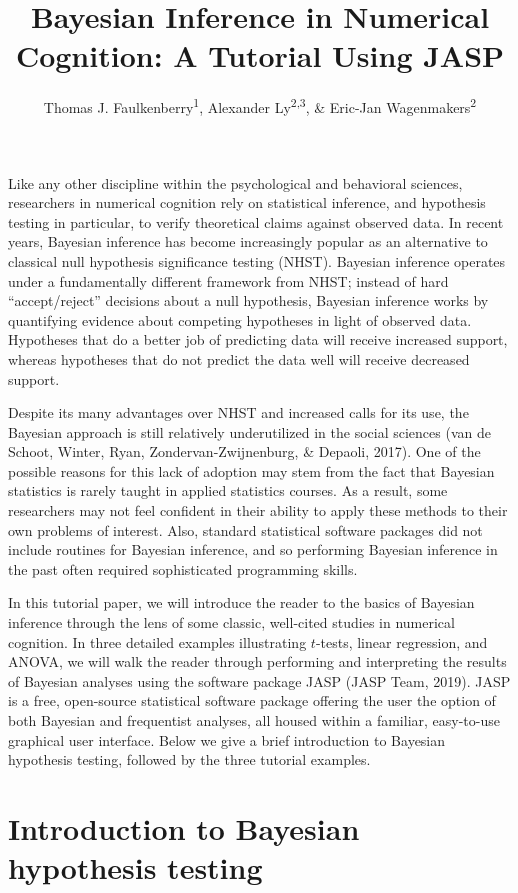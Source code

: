 \documentclass[english,,doc,floatsintext]{apa6}
\title{Bayesian Inference in Numerical Cognition: A Tutorial Using JASP}
\author{Thomas J. Faulkenberry\textsuperscript{1}, Alexander Ly\textsuperscript{2,3}, \& Eric-Jan Wagenmakers\textsuperscript{2}}
\date{}
\affiliation{
\vspace{0.5cm}
\textsuperscript{1} Tarleton State University\\\textsuperscript{2} University of Amsterdam\\\textsuperscript{3} Centrum Wiskunde \& Informatica}
\begin{document}
\maketitle

Like any other discipline within the psychological and behavioral sciences, researchers in numerical cognition rely on statistical inference, and hypothesis testing in particular, to verify theoretical claims against observed data. In recent years, Bayesian inference has become increasingly popular as an alternative to classical null hypothesis significance testing (NHST). Bayesian inference operates under a fundamentally different framework from NHST; instead of hard \enquote{accept/reject} decisions about a null hypothesis, Bayesian inference works by quantifying evidence about competing hypotheses in light of observed data. Hypotheses that do a better job of predicting data will receive increased support, whereas hypotheses that do not predict the data well will receive decreased support.

Despite its many advantages over NHST and increased calls for its use, the Bayesian approach is still relatively underutilized in the social sciences (van de Schoot, Winter, Ryan, Zondervan-Zwijnenburg, \& Depaoli, 2017). One of the possible reasons for this lack of adoption may stem from the fact that Bayesian statistics is rarely taught in applied statistics courses. As a result, some researchers may not feel confident in their ability to apply these methods to their own problems of interest. Also, standard statistical software packages did not include routines for Bayesian inference, and so performing Bayesian inference in the past often required sophisticated programming skills.

In this tutorial paper, we will introduce the reader to the basics of Bayesian inference through the lens of some classic, well-cited studies in numerical cognition. In three detailed examples illustrating \(t\)-tests, linear regression, and ANOVA, we will walk the reader through performing and interpreting the results of Bayesian analyses using the software package JASP (JASP Team, 2019). JASP is a free, open-source statistical software package offering the user the option of both Bayesian and frequentist analyses, all housed within a familiar, easy-to-use graphical user interface. Below we give a brief introduction to Bayesian hypothesis testing, followed by the three tutorial examples.

\hypertarget{introduction-to-bayesian-hypothesis-testing}{%
\section{Introduction to Bayesian hypothesis testing}\label{introduction-to-bayesian-hypothesis-testing}}
\end{document}
